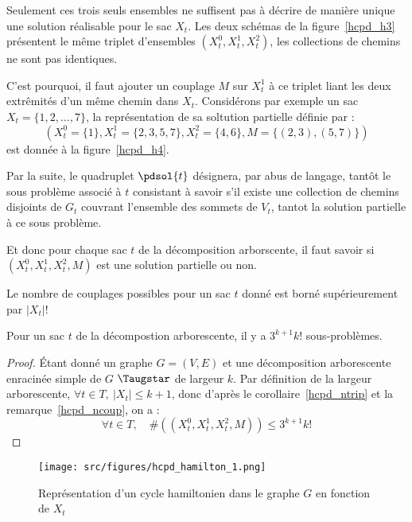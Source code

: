 Seulement ces trois seuls ensembles ne suffisent pas à décrire de manière unique une solution
réalisable pour le sac $X_t$. Les deux schémas de la figure~\ref{hcpd_h3} présentent le même triplet
d'ensembles $(X_t^0, X_t^1, X_t^2)$, les collections de chemins ne sont pas identiques.

C'est pourquoi, il faut ajouter un couplage $M$ sur $X_t^1$ à ce triplet liant les deux extrêmités d'un même chemin
dans $X_t$. Considérons par exemple un sac $X_t = \{1, 2, \dots, 7\}$, la représentation de sa
soltution partielle définie par : \[
    (X_t^0 = \{1\}, X_t^1 = \{2, 3, 5, 7\}, X_t^2 = \{4, 6\}, M = \{(2,3), (5,7)\})
\] est donnée à la figure~\ref{hcpd_h4}.

Par la suite, le quadruplet $\pdsol{t}$ désignera, par abus de langage, tantôt le sous problème
associé à $t$ consistant à savoir s'il existe une collection de chemins disjoints de $G_t$ couvrant
l'ensemble des sommets de $V_t$, tantot la solution partielle à ce sous problème.

Et donc pour chaque sac $t$ de la décomposition arborscente, il faut savoir si $(X_t^0, X_t^1,
X_t^2, M)$ est une solution partielle ou non.

\begin{nrmq}
    \label{hcpd_ncoup}
    Le nombre de couplages possibles pour un sac $t$ donné est borné supérieurement par $|X_t|!$
\end{nrmq}

\begin{nlemma}
    Pour un sac $t$ de la décompostion arborescente, il y a $3^{k+1} k!$ sous-problèmes.
\end{nlemma}

\begin{proof}
    Étant donné un graphe $G=(V,E)$ et une décomposition arborescente enracinée simple de $G$
    $\Taugstar$ de largeur $k$. Par définition de la largeur arborescente, $\forall t \in T,\ |X_t|
    \leq k + 1$, donc d'après le corollaire~\ref{hcpd_ntrip} et la remarque~\ref{hcpd_ncoup}, on a : \[
        \forall t \in T,\quad \#((X_t^0, X_t^1, X_t^2, M)) \leq 3^{k+1} k!
    \]
\end{proof}

\begin{figure}
    \begin{center}
        \texttt{[image: src/figures/hcpd\_hamilton\_1.png]}
        \caption{Représentation d'un cycle hamiltonien dans le graphe $G$ en fonction de $X_t$}
        \label{hcpd_h1}
    \end{center}
\end{figure}


